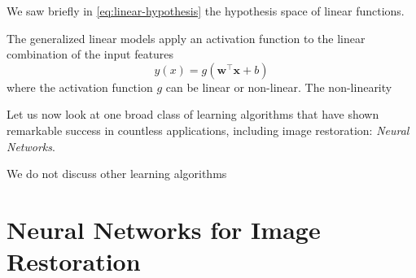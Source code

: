 We saw briefly in \cref{eq:linear-hypothesis} the hypothesis space of linear functions. 

The generalized linear models apply an activation function to the linear combination of the input features
\begin{equation}
    y(x) = g(\mathbf{w}^\top \mathbf{x} + b)
\end{equation}
where the activation function $g$ can be linear or non-linear. The non-linearity 



Let us now look at one broad class of learning algorithms that have shown remarkable success in countless applications, including image restoration: \textit{Neural Networks}.

We do not discuss other learning algorithms

\section{Neural Networks for Image Restoration}

